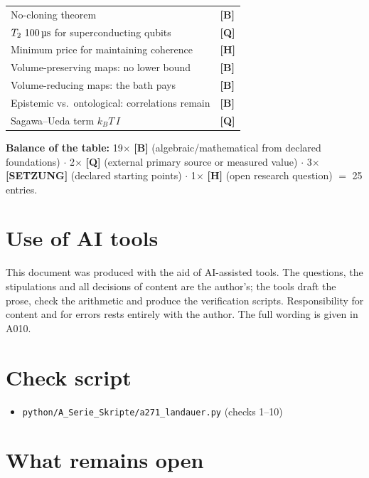 \begin{center}
\begin{longtable}{@{}p{}l@{}}
No-cloning theorem & \textbf{[B]} \\
$T_2 \sim 100\,\text{\textmu s}$ for superconducting qubits & \textbf{[Q]} \\
Minimum price for maintaining coherence & \textbf{[H]} \\
Volume-preserving maps: no lower bound & \textbf{[B]} \\
Volume-reducing maps: the bath pays & \textbf{[B]} \\
Epistemic vs.\ ontological: correlations remain & \textbf{[B]} \\
Sagawa--Ueda term $k_B T\,I$ & \textbf{[Q]} \\
\bottomrule
\end{longtable}
\end{center}

\textbf{Balance of the table:} 19$\times$ \textbf{[B]} (algebraic/mathematical from
declared foundations) $\cdot$ 2$\times$ \textbf{[Q]} (external primary source or measured
value) $\cdot$ 3$\times$ \textbf{[SETZUNG]} (declared starting points) $\cdot$ 1$\times$ \textbf{[H]}
(open research question) $=$ 25 entries.

\section{Use of AI tools}

This document was produced with the aid of AI-assisted tools. The questions, the
stipulations and all decisions of content are the author's; the tools draft the
prose, check the arithmetic and produce the verification scripts. Responsibility
for content and for errors rests entirely with the author. The full wording is
given in A010.

\section{Check script}

\begin{itemize}
  \item \texttt{python/A\_Serie\_Skripte/a271\_landauer.py} (checks 1--10)
\end{itemize}

\section{What remains open}

